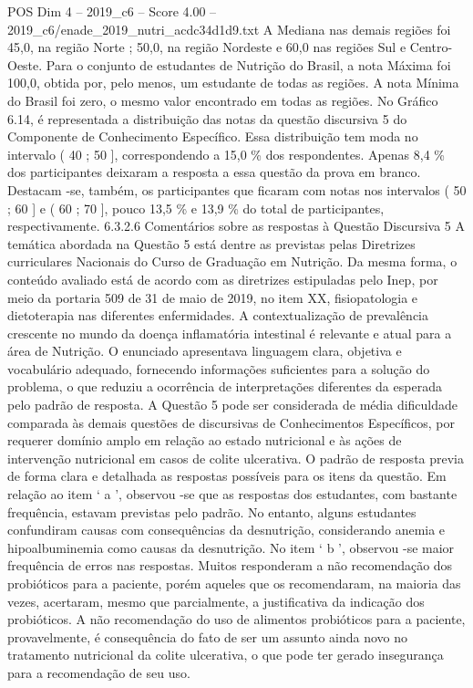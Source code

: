 \begin{textsample}{POS Dim 4 – 2019\_c6 – Score 4.00 – 2019\_c6/enade\_2019\_nutri\_acdc34d1d9.txt}
A Mediana nas demais regiões foi 45,0, na região Norte ; 50,0, na região Nordeste e 60,0 nas regiões Sul e Centro-Oeste.
Para o conjunto de estudantes de Nutrição do Brasil, a nota Máxima foi 100,0, obtida por, pelo menos, um estudante de todas as regiões.
A nota Mínima do Brasil foi zero, o mesmo valor encontrado em todas as regiões.
No Gráfico 6.14, é representada a distribuição das notas da questão discursiva 5 do Componente de Conhecimento Específico.
Essa distribuição tem moda no intervalo ( 40 ; 50 ], correspondendo a 15,0 \% dos respondentes.
Apenas 8,4 \% dos participantes deixaram a resposta a essa questão da prova em branco.
Destacam -se, também, os participantes que ficaram com notas nos intervalos ( 50 ; 60 ] e ( 60 ; 70 ], pouco 13,5 \% e 13,9 \% do total de participantes, respectivamente. 6.3.2.6 Comentários sobre as respostas à Questão Discursiva 5 A temática abordada na Questão 5 está dentre as previstas pelas Diretrizes curriculares Nacionais do Curso de Graduação em Nutrição.
Da mesma forma, o conteúdo avaliado está de acordo com as diretrizes estipuladas pelo Inep, por meio da portaria 509 de 31 de maio de 2019, no item XX, fisiopatologia e dietoterapia nas diferentes enfermidades.
A contextualização de prevalência crescente no mundo da doença inflamatória intestinal é relevante e atual para a área de Nutrição.
O enunciado apresentava linguagem clara, objetiva e vocabulário adequado, fornecendo informações suficientes para a solução do problema, o que reduziu a ocorrência de interpretações diferentes da esperada pelo padrão de resposta.
A Questão 5 pode ser considerada de média dificuldade comparada às demais questões de discursivas de Conhecimentos Específicos, por requerer domínio amplo em relação ao estado nutricional e às ações de intervenção nutricional em casos de colite ulcerativa.
O padrão de resposta previa de forma clara e detalhada as respostas possíveis para os itens da questão.
Em relação ao item ‘ a ’, observou -se que as respostas dos estudantes, com bastante frequência, estavam previstas pelo padrão.
No entanto, alguns estudantes confundiram causas com consequências da desnutrição, considerando anemia e hipoalbuminemia como causas da desnutrição.
No item ‘ b ’, observou -se maior frequência de erros nas respostas.
Muitos responderam a não recomendação dos probióticos para a paciente, porém aqueles que os recomendaram, na maioria das vezes, acertaram, mesmo que parcialmente, a justificativa da indicação dos probióticos.
A não recomendação do uso de alimentos probióticos para a paciente, provavelmente, é consequência do fato de ser um assunto ainda novo no tratamento nutricional da colite ulcerativa, o que pode ter gerado insegurança para a recomendação de seu uso.

\end{textsample}
